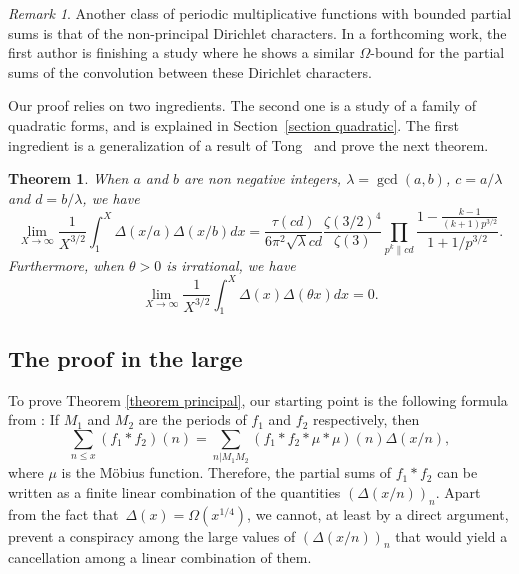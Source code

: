 \documentclass[a4paper,12pt, reqn0]{amsart}
\newtheorem{theorem}{Theorem}[section]
\theoremstyle{remark}
\newtheorem{remark}{Remark}[section]
\begin{document}
\begin{remark} Another class of periodic multiplicative functions with bounded partial sums is that of the non-principal Dirichlet characters. In a forthcoming work, the first author is finishing a study where he shows a similar $\Omega$-bound for the partial sums of the convolution between these Dirichlet characters.
\end{remark}

Our proof relies on two ingredients. The second one is a study of a
family of quadratic forms, and is explained in Section~\ref{section quadratic}.
The first ingredient is a generalization
of a result of Tong~\cite{Tong*56} and prove the next theorem.
\begin{theorem}
  \label{TongGen}
  When $a$ and $b$ are non negative integers, $\lambda=\gcd(a,b)$, $c=a/\lambda$ and
  $d=b/\lambda$, we have
  \begin{equation*}
    \lim_{X\to\infty}\frac{1}{X^{3/2}}\int_{1}^X
    \Delta(x/a)\Delta(x/b)dx=\frac{\tau(cd)}{6\pi^2\sqrt{\lambda}cd}
    \frac{\zeta(3/2)^4}{\zeta(3)}
    \prod_{p^k\|cd}\frac{1-\frac{k-1}{(k+1)p^{3/2}}}{1+1/p^{3/2}}.
  \end{equation*}
  Furthermore, when $\theta>0$ is irrational, we have
  \begin{equation*}
    \lim_{X\to\infty}\frac{1}{X^{3/2}}\int_{1}^X
    \Delta(x)\Delta(\theta x)dx=0.
  \end{equation*}
\end{theorem}
\subsection{The proof in the large}
To prove Theorem \ref{theorem principal}, our starting point is the following formula from \cite{Aymone*22}: If $M_1$ and $M_2$ are the periods of $f_1$ and $f_2$ respectively, then
\begin{equation}\label{equation sum f ast g}
  \sum_{n\leq x}(f_1\ast f_2)(n)=\sum_{n|M_1M_2}(f_1\ast f_2\ast \mu \ast \mu)(n)\Delta(x/n),
\end{equation}
where $\mu$ is the M\"obius function. Therefore, the partial sums of
$f_1\ast f_2$ can be written as a finite linear combination of the
quantities $(\Delta(x/n))_n$. Apart from the fact that~$\Delta(x)=\Omega(x^{1/4})$, we cannot, at least by a direct argument,
prevent a conspiracy among the large values of $(\Delta(x/n))_n$ that
would yield a cancellation among a linear combination
of them.
\end{document}
